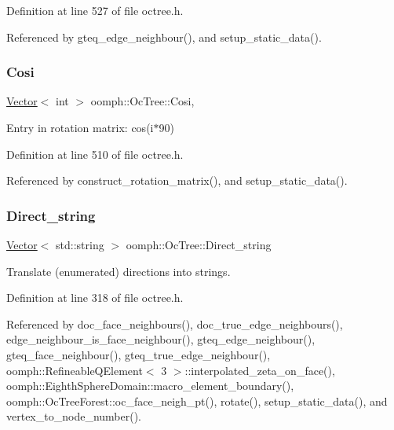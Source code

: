 Definition at line 527 of file octree.\+h.



Referenced by gteq\+\_\+edge\+\_\+neighbour(), and setup\+\_\+static\+\_\+data().

\mbox{\label{classoomph_1_1OcTree_aa9c70aef8a78008e8fa668c5e0e516d9}} 
\subsubsection{\texorpdfstring{Cosi}{Cosi}}
{\footnotesize\ttfamily \hyperlink{classoomph_1_1Vector}{Vector}$<$ int $>$ oomph\+::\+Oc\+Tree\+::\+Cosi\hspace{0.3cm}{\ttfamily [static]}, {\ttfamily [private]}}



Entry in rotation matrix\+: cos(i$\ast$90) 



Definition at line 510 of file octree.\+h.



Referenced by construct\+\_\+rotation\+\_\+matrix(), and setup\+\_\+static\+\_\+data().

\mbox{\label{classoomph_1_1OcTree_a2e9487b716f4d583aada06a850b8eae9}} 
\subsubsection{\texorpdfstring{Direct\+\_\+string}{Direct\_string}}
{\footnotesize\ttfamily \hyperlink{classoomph_1_1Vector}{Vector}$<$ std\+::string $>$ oomph\+::\+Oc\+Tree\+::\+Direct\+\_\+string\hspace{0.3cm}{\ttfamily [static]}}



Translate (enumerated) directions into strings. 



Definition at line 318 of file octree.\+h.



Referenced by doc\+\_\+face\+\_\+neighbours(), doc\+\_\+true\+\_\+edge\+\_\+neighbours(), edge\+\_\+neighbour\+\_\+is\+\_\+face\+\_\+neighbour(), gteq\+\_\+edge\+\_\+neighbour(), gteq\+\_\+face\+\_\+neighbour(), gteq\+\_\+true\+\_\+edge\+\_\+neighbour(), oomph\+::\+Refineable\+Q\+Element$<$ 3 $>$\+::interpolated\+\_\+zeta\+\_\+on\+\_\+face(), oomph\+::\+Eighth\+Sphere\+Domain\+::macro\+\_\+element\+\_\+boundary(), oomph\+::\+Oc\+Tree\+Forest\+::oc\+\_\+face\+\_\+neigh\+\_\+pt(), rotate(), setup\+\_\+static\+\_\+data(), and vertex\+\_\+to\+\_\+node\+\_\+number().

